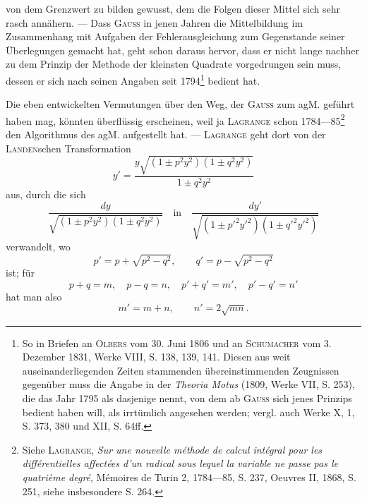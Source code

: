 von dem Grenzwert zu bilden gewusst, dem die Folgen dieser Mittel
sich sehr rasch annähern. — Dass \textsc{Gauss} in jenen Jahren die Mittelbildung
im Zusammenhang mit Aufgaben der Fehlerausgleichung zum Gegenstande
seiner Überlegungen gemacht hat, geht schon daraus hervor, dass er nicht
lange nachher zu dem Prinzip der Methode der kleinsten Quadrate vorgedrungen
sein muss, dessen er sich nach seinen Angaben seit 1794\footnote{So in Briefen an \textsc{Olbers} vom 30. Juni 1806 und an \textsc{Schumacher} vom 3. Dezember 1831, Werke VIII, S. 138, 139, 141. Diesen aus weit auseinanderliegenden Zeiten stammenden übereinstimmenden Zeugnissen gegenüber muss die Angabe in der \textit{Theoria Motus} (1809, Werke VII, S. 253), die das Jahr 1795 als dasjenige nennt, von dem ab \textsc{Gauss} sich jenes Prinzips bedient haben will, als irrtümlich angesehen werden; vergl. auch Werke X, 1, S. 373, 380 und XII, S. 64ff.} bedient hat.

Die eben entwickelten Vermutungen über den Weg, der \textsc{Gauss} zum agM.
geführt haben mag, könnten überflüssig erscheinen, weil ja \textsc{Lagrange} schon
1784—85\footnote{Siehe \textsc{Lagrange}, \textit{Sur une nouvelle méthode de calcul intégral pour les différentielles affectées d’un radical sous lequel la variable ne passe pas le quatrième degré}, Mémoires de Turin 2, 1784—85, S. 237, Oeuvres II, 1868, S. 251, siehe insbesondere S. 264.} den Algorithmus des agM. aufgestellt hat. — \textsc{Lagrange} geht dort
von der \textsc{Landen}schen Transformation
\[
y'=\frac{y\sqrt{(1\pm p^2y^2)(1\pm q^2y^2)}}{1\pm q^2y^2}
\]
aus, durch die sich
\[
\frac{dy}{\sqrt{(1\pm p^2y^2)(1\pm q^2y^2)}}\quad\text{in}\quad
\frac{dy'}{\sqrt{(1\pm p'^2y'^2)(1\pm q'^2y'^2)}}
\]
verwandelt, wo
\[
p'=p+\sqrt{p^2-q^2},\qquad q'=p-\sqrt{p^2-q^2}
\]
ist; für
\[
p+q=m,\quad p-q=n,\quad p'+q'=m',\quad p'-q'=n'
\]
hat man also
\[
m'=m+n,\qquad n'=2\sqrt{mn}.
\]

